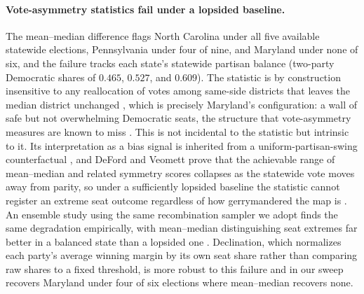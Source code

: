 \paragraph{Vote-asymmetry statistics fail under a lopsided baseline.}
The mean--median difference flags North Carolina under all five available
statewide elections, Pennsylvania under four of nine, and Maryland under none
of six, and the failure tracks each state's statewide partisan balance
(two-party Democratic shares of $0.465$, $0.527$, and $0.609$). The statistic
is by construction insensitive to any reallocation of votes among same-side
districts that leaves the median district unchanged \cite{warrington2018quantifying},
which is precisely Maryland's configuration: a wall of safe but not
overwhelming Democratic seats, the structure that vote-asymmetry measures are
known to miss \cite{nagle2020unbalanced}. This is not incidental to the
statistic but intrinsic to it. Its interpretation as a bias signal is inherited
from a uniform-partisan-swing counterfactual \cite{katz2020theoretical}, and
DeFord and Veomett prove that the achievable range of mean--median and related
symmetry scores collapses as the statewide vote moves away from parity, so
under a sufficiently lopsided baseline the statistic cannot register an extreme
seat outcome regardless of how gerrymandered the map is \cite{deford2024bounds}.
An ensemble study using the same recombination sampler we adopt finds the same
degradation empirically, with mean--median distinguishing seat extremes far
better in a balanced state than a lopsided one \cite{deford2021implementing,
deford2021recombination}. Declination, which normalizes each party's average
winning margin by its own seat share rather than comparing raw shares to a fixed
threshold, is more robust to this failure \cite{warrington2018comparison} and
in our sweep recovers Maryland under four of six elections where mean--median
recovers none.

